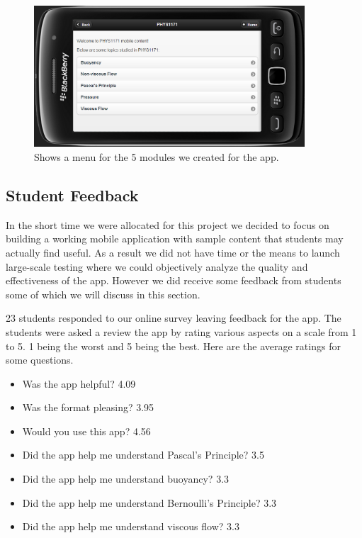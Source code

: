 \documentclass[12pt,a4paper]{article}  %
\begin{document}
\begin{figure}[htb]
\centering
\includegraphics[width=0.9\textwidth]{menu.png}
\caption{Shows a menu for the 5 modules we created for the app.}
\label{fig:menu}
\end{figure}

\subsection{Student Feedback}

In the short time we were allocated for this project we decided to focus on building a working mobile application with sample content that students may actually find useful. As a result we did not have time or the means to launch large-scale testing where we could objectively analyze the quality and effectiveness of the app. However we did receive some feedback from students some of which we will discuss in this section.

23 students responded to our online survey leaving feedback for the app. The students were asked a review the app by rating various aspects on a scale from 1 to 5. 1 being the worst and 5 being the best. Here are the average ratings for some questions.

\begin{itemize}
\item Was the app helpful? 4.09
\item Was the format pleasing? 3.95
\item Would you use this app? 4.56
\item Did the app help me understand Pascal's Principle? 3.5 
\item Did the app help me understand buoyancy? 3.3
\item Did the app help me understand Bernoulli's Principle? 3.3
\item Did the app help me understand viscous flow? 3.3
\end{itemize}
\end{document}
